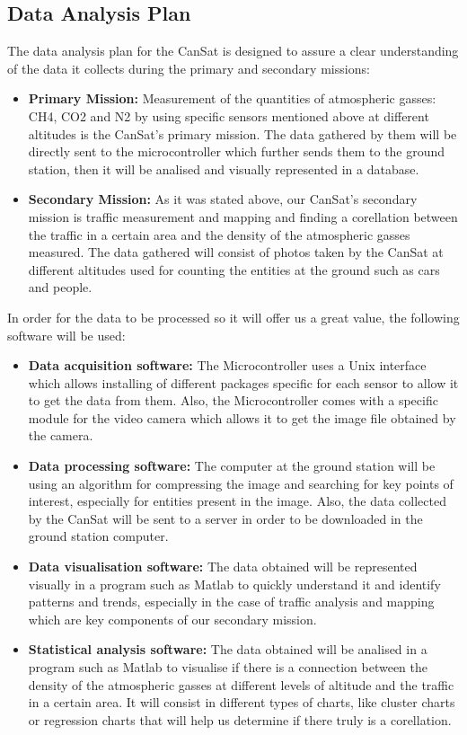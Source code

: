 \documentclass[11pt]{article}
\begin{document}
\subsection{Data Analysis Plan}
The data analysis plan for the CanSat is designed to assure a clear understanding of the data it collects during the primary and secondary missions:
\begin{itemize}
\item \textbf{Primary Mission:} Measurement of the quantities of atmospheric gasses: CH4, CO2 and N2 by using specific sensors mentioned above at different altitudes is the CanSat's primary mission. The data gathered by them will be directly sent to the microcontroller which further sends them to the ground station, then it will be analised and visually represented in a database.
\item \textbf{Secondary Mission:} As it was stated above, our CanSat's secondary mission is traffic measurement and mapping and finding a corellation between the traffic in a certain area and the density of the atmospheric gasses measured. The data gathered will consist of photos taken by the CanSat at different altitudes used for counting the entities at the ground such as cars and people.
\end {itemize}
In order for the data to be processed so it will offer us a great value, the following software will be used:
\begin{itemize}
\item \textbf{Data acquisition software:} The Microcontroller uses a Unix interface which allows installing of different packages specific for each sensor to allow it to get the data from them. Also, the Microcontroller comes with a specific module for the video camera which allows it to get the image file obtained by the camera.
\item \textbf{Data  processing software:} The computer at the ground station will be using an algorithm for compressing the image and searching for key points of interest, especially for entities present in the image. Also, the data collected by the CanSat will be sent to a server in order to be downloaded in the ground station computer.
\item \textbf{Data visualisation software:} The data obtained will be represented visually in a program such as Matlab to quickly understand it and identify patterns and trends, especially in the case of traffic analysis and mapping which are key components of our secondary mission.
\item \textbf{Statistical analysis software:} The data obtained will be analised in a program such as Matlab to visualise if there is a connection between the density of the atmospheric gasses at different levels of altitude and the traffic in a certain area. It will consist in different types of charts, like cluster charts or regression charts that will help us determine if there truly is a corellation.
\end{itemize}
\end{document}
